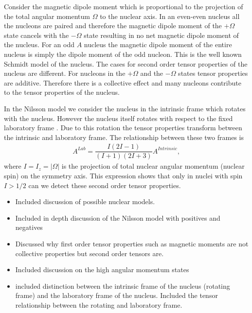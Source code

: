 \documentclass[8pt,a4paper, twoside]{report}
\begin{document}
Consider the magnetic dipole moment  which is proportional to  the projection of the total angular momentum $\Omega$ to the nuclear axis. In an even-even nucleus all the nucleons are paired and therefore the magnetic dipole moment of the $+\Omega$ state cancels with the $-\Omega$ state resulting in no net magnetic dipole moment of the nucleus. For an odd $A$ nucleus  the magnetic dipole moment of the entire nucleus is simply the dipole moment of the odd nucleon. This is the well known Schmidt model of the nucleus. The cases for second order tensor properties of the nucleus are different. For  nucleons in the  $+\Omega$ and the $-\Omega$ states tensor properties  are additive. Therefore there is a collective effect and many nucleons contribute to the tensor properties of the nucleus.

In the Nilsson model we consider the nucleus in the intrinsic frame which rotates with the nucleus. However the nucleus itself rotates with respect to the fixed laboratory frame \cite{BohrMottVol2}. Due to this rotation the tensor properties transform between the intrinsic  and laboratory frame. The relationship between these two frames is \cite{BohrMottVol2}
\begin{align} \label{eq:RotationalFactor}
A^{Lab} = \dfrac{I\left(2I - 1\right)}{\left(I + 1 \right)\left(2I + 3\right)}A^{Intrinsic},
\end{align}
where $I=I_z= \left|\Omega\right|$ is the projection of total nuclear angular momentum (nuclear spin) on the symmetry axis. This expression shows that only in nuclei with spin $I > 1/2$ can we detect these second order tensor properties. 

\begin{itemize}
\item Included discussion of possible nuclear models.
\item Included in depth discussion of the Nilsson model with positives and negatives
\item Discussed why first order tensor properties such as magnetic moments are not collective properties but second order tensors are.
\item Included discussion on the high angular momentum states
\item included distinction between the intrinsic frame of the nucleus (rotating frame) and the laboratory frame of the nucleus. Included the tensor relationship between the rotating and laboratory frame.
\end{itemize}
\end{document}
